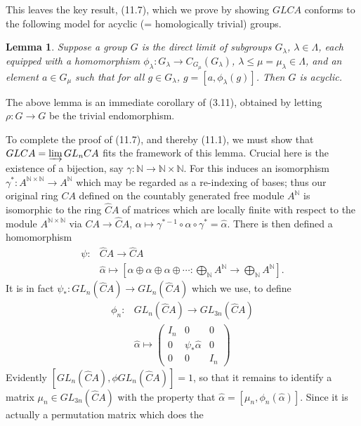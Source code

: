 \documentclass[openany,leqno]{book}  %
\newcommand{\N}{\mathbb{N}}
\newtheorem{lemma}[theorem]{Lemma}
\begin{document}
This leaves the key result, (11.7), which we prove by showing $GLCA$ conforms to the following model for acyclic (= homologically trivial) groups.
\begin{lemma}
  Suppose a group $G$ is the direct limit of subgroups $G_\lambda$, $\lambda \in \Lambda$, each equipped with a homomorphism $\phi_\lambda\colon   G_\lambda \longrightarrow  C_{G_\mu}(G_\lambda)$, $\lambda \leqslant \mu = \mu_\lambda \in \Lambda$, and an element $a \in G_\mu$ such that for all $g\in G_\lambda$, $g=[a, \phi_\lambda(g)]$. Then $G$ is acyclic.
\end{lemma}
The above lemma is an immediate corollary of (3.11), obtained by letting $\rho \colon   G\longrightarrow G$ be the trivial endomorphism.

To complete the proof of (11.7), and thereby (11.1), we must show that $GLCA = \varinjlim GL_nCA$ fits the framework of this lemma. Crucial here is the existence of a bijection, say $\gamma \colon   \N \longrightarrow  \N \times \N$.
For this induces an isomorphism $\gamma^* \colon   A^{\N\times \N} \longrightarrow  A^\N$ which may be regarded as a re-indexing of bases; thus our original ring $CA$ defined on the countably generated free module $A^\N$ is isomorphic to the ring $\hat{C}A$ of matrices which are locally finite with respect to the module $A^{\N \times \N}$ via $CA \longrightarrow \hat{C}A$, $\alpha \mapsto \gamma^{*-1}\circ \alpha \circ \gamma^* =\hat{\alpha}$. There is then defined a homomorphism
\begin{align*}
\psi \colon  & \hat{C}A \longrightarrow \hat{C}A \\
   & \hat{\alpha} \mapsto [\alpha \oplus  \alpha \oplus \alpha \oplus \cdots\colon   \bigoplus_\N A^\N \longrightarrow \bigoplus_\N A^\N ].
\end{align*}
It is in fact $\psi_* \colon   GL_n(\hat{C}A) \longrightarrow  GL_n(\hat{C}A)$ which we use, to define
\begin{align*}
  \phi_n\colon  & GL_n(\hat{C}A)\longrightarrow GL_{3n}(\hat{C}A) \\
  & \hat{\alpha} \mapsto \begin{pmatrix}
    I_n & 0 & 0\\
    0 & \psi_*\hat{\alpha} & 0\\
    0 & 0& I_n
  \end{pmatrix}
\end{align*}
Evidently $[GL_n(\hat{C}A), \phi GL_n(\hat{C}A)] = 1$, so that it remains to identify a matrix $\mu_n \in GL_{3n}(\hat{C}A)$ with the property that $\hat{\alpha} = [\mu_n, \phi_n(\hat{\alpha})]$. Since it is actually a permutation matrix which does the
\end{document}
